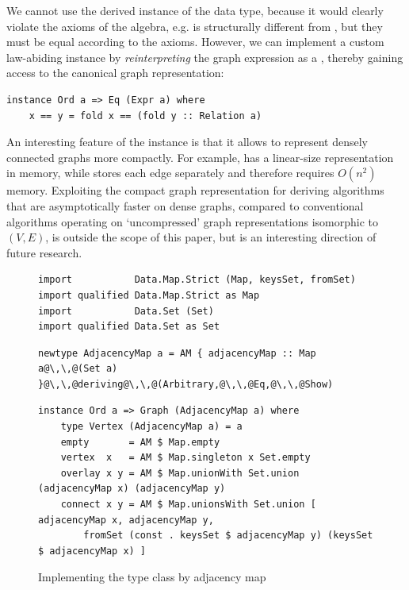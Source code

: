 We cannot use the derived  instance of the  data type, because it
would clearly violate the axioms of the algebra, e.g.  is
structurally different from , but they must be equal according to the axioms.
However, we can implement a custom law-abiding 
instance by \emph{reinterpreting} the graph expression 
as a , thereby gaining access to the canonical graph representation:

\begin{verbatim}
instance Ord a => Eq (Expr a) where
    x == y = fold x == (fold y :: Relation a)
\end{verbatim}

An interesting feature of the  instance is that it allows to represent
densely connected graphs more compactly. For example, 
has a linear-size representation in memory, while 
stores each edge separately and therefore requires $O(n^2)$ memory. Exploiting the
compact graph representation for deriving algorithms that are asymptotically faster
on dense graphs, compared to conventional algorithms operating on `uncompressed'
graph representations isomorphic to $(V,E)$, is outside the scope of this paper,
but is an interesting direction of future research.

\begin{figure}[b]
\vspace{-2mm}
\begin{verbatim}
import           Data.Map.Strict (Map, keysSet, fromSet)
import qualified Data.Map.Strict as Map
import           Data.Set (Set)
import qualified Data.Set as Set
\end{verbatim}
\vspace{1mm}
\begin{verbatim}
newtype AdjacencyMap a = AM { adjacencyMap :: Map a@\,\,@(Set a) }@\,\,@deriving@\,\,@(Arbitrary,@\,\,@Eq,@\,\,@Show)
\end{verbatim}
\vspace{1mm}
\begin{verbatim}
instance Ord a => Graph (AdjacencyMap a) where
    type Vertex (AdjacencyMap a) = a
    empty       = AM $ Map.empty
    vertex  x   = AM $ Map.singleton x Set.empty
    overlay x y = AM $ Map.unionWith Set.union (adjacencyMap x) (adjacencyMap y)
    connect x y = AM $ Map.unionsWith Set.union [ adjacencyMap x, adjacencyMap y,
        fromSet (const . keysSet $ adjacencyMap y) (keysSet $ adjacencyMap x) ]
\end{verbatim}
\vspace{-3mm}
\caption{Implementing the  type class by adjacency map\label{fig-adjacency-map}}
\vspace{-1mm}
\end{figure}

